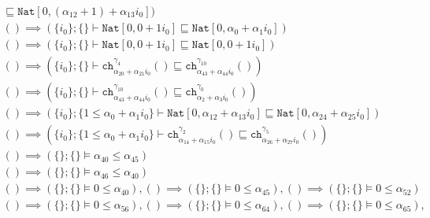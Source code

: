 {\begin{align*}
\sqsubseteq \texttt{Nat}[0, (\alpha_{12}+1) + \alpha_{13}i_{0}])\\ () \implies (\{i_{0}\};\{\}  \vdash \texttt{Nat}[0, 0 + 1i_{0}] \sqsubseteq \texttt{Nat}[0, \alpha_{0} + \alpha_{1}i_{0}])\\ () \implies (\{i_{0}\};\{\}  \vdash \texttt{Nat}[0, 0 + 1i_{0}] \sqsubseteq \texttt{Nat}[0, 0 + 1i_{0}])\\ () \implies (\{i_{0}\};\{\}  \vdash \texttt{ch}^{\gamma_{4}}_{\alpha_{20} + \alpha_{21}i_{0}}() \sqsubseteq \texttt{ch}^{\gamma_{10}}_{\alpha_{43} + \alpha_{44}i_{0}}())\\ () \implies (\{i_{0}\};\{\}  \vdash \texttt{ch}^{\gamma_{10}}_{\alpha_{43} + \alpha_{44}i_{0}}() \sqsubseteq \texttt{ch}^{\gamma_{0}}_{\alpha_{2} + \alpha_{3}i_{0}}())\\ () \implies (\{i_{0}\};\{1 \leq \alpha_{0} + \alpha_{1}i_{0}\}  \vdash \texttt{Nat}[0, \alpha_{12} + \alpha_{13}i_{0}] \sqsubseteq \texttt{Nat}[0, \alpha_{24} + \alpha_{25}i_{0}])\\ () \implies (\{i_{0}\};\{1 \leq \alpha_{0} + \alpha_{1}i_{0}\}  \vdash \texttt{ch}^{\gamma_{2}}_{\alpha_{14} + \alpha_{15}i_{0}}() \sqsubseteq \texttt{ch}^{\gamma_{5}}_{\alpha_{26} + \alpha_{27}i_{0}}())\\ () \implies (\{\};\{\}  \vDash \alpha_{40} \leq \alpha_{45})\\ () \implies (\{\};\{\}  \vDash \alpha_{46} \leq \alpha_{40})\\ () \implies (\{\};\{\}  \vDash 0 \leq \alpha_{40}), () \implies (\{\};\{\}  \vDash 0 \leq \alpha_{45}), () \implies (\{\};\{\}  \vDash 0 \leq \alpha_{52})\\
    () \implies (\{\};\{\}  \vDash 0 \leq \alpha_{56}), () \implies (\{\};\{\}  \vDash 0 \leq \alpha_{64}), () \implies (\{\};\{\}  \vDash 0 \leq \alpha_{65}),

\end{align*}}
